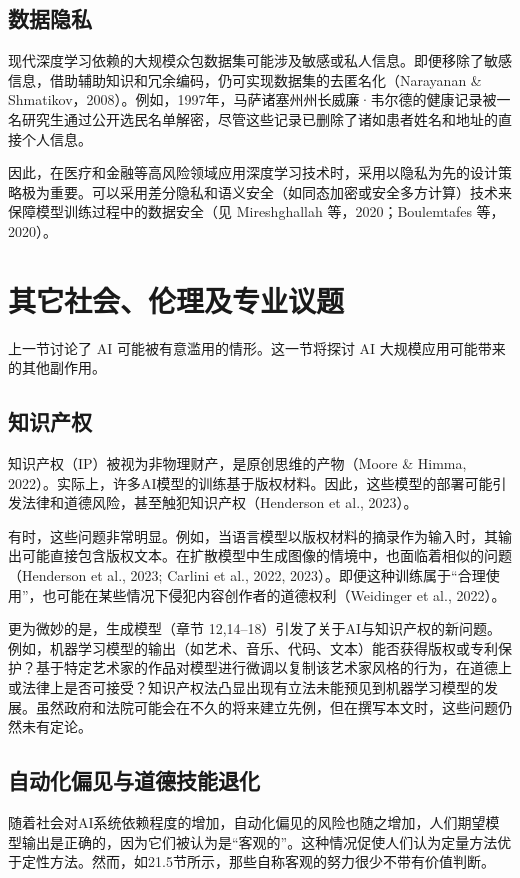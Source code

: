 \documentclass[lang=cn,newtx,10pt,scheme=chinese]{elegantbook}
\begin{document}
\subsection{数据隐私}
现代深度学习依赖的大规模众包数据集可能涉及敏感或私人信息。即便移除了敏感信息，借助辅助知识和冗余编码，仍可实现数据集的去匿名化（Narayanan \& Shmatikov，2008）。例如，1997年，马萨诸塞州州长威廉·韦尔德的健康记录被一名研究生通过公开选民名单解密，尽管这些记录已删除了诸如患者姓名和地址的直接个人信息。

因此，在医疗和金融等高风险领域应用深度学习技术时，采用以隐私为先的设计策略极为重要。可以采用差分隐私和语义安全（如同态加密或安全多方计算）技术来保障模型训练过程中的数据安全（见 Mireshghallah 等，2020；Boulemtafes 等，2020）。

\section{其它社会、伦理及专业议题}
上一节讨论了 AI 可能被有意滥用的情形。这一节将探讨 AI 大规模应用可能带来的其他副作用。

\subsection{知识产权}
知识产权（IP）被视为非物理财产，是原创思维的产物（Moore \& Himma, 2022）。实际上，许多AI模型的训练基于版权材料。因此，这些模型的部署可能引发法律和道德风险，甚至触犯知识产权（Henderson et al., 2023）。

有时，这些问题非常明显。例如，当语言模型以版权材料的摘录作为输入时，其输出可能直接包含版权文本。在扩散模型中生成图像的情境中，也面临着相似的问题（Henderson et al., 2023; Carlini et al., 2022, 2023）。即便这种训练属于“合理使用”，也可能在某些情况下侵犯内容创作者的道德权利（Weidinger et al., 2022）。

更为微妙的是，生成模型（章节 12,14–18）引发了关于AI与知识产权的新问题。例如，机器学习模型的输出（如艺术、音乐、代码、文本）能否获得版权或专利保护？基于特定艺术家的作品对模型进行微调以复制该艺术家风格的行为，在道德上或法律上是否可接受？知识产权法凸显出现有立法未能预见到机器学习模型的发展。虽然政府和法院可能会在不久的将来建立先例，但在撰写本文时，这些问题仍然未有定论。

\subsection{自动化偏见与道德技能退化}
随着社会对AI系统依赖程度的增加，自动化偏见的风险也随之增加，人们期望模型输出是正确的，因为它们被认为是“客观的”。这种情况促使人们认为定量方法优于定性方法。然而，如21.5节所示，那些自称客观的努力很少不带有价值判断。
\end{document}
